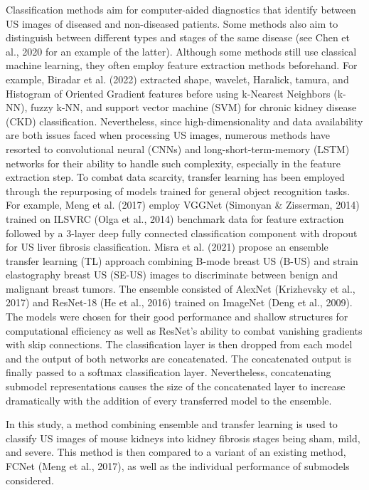\documentclass[
]{article}
\begin{document}
Classification methods aim for computer-aided diagnostics that identify
between US images of diseased and non-diseased patients. Some methods
also aim to distinguish between different types and stages of the same
disease (see Chen et al., 2020 for an example of the latter). Although
some methods still use classical machine learning, they often employ
feature extraction methods beforehand. For example, Biradar et al.
(2022) extracted shape, wavelet, Haralick, tamura, and Histogram of
Oriented Gradient features before using k-Nearest Neighbors (k-NN),
fuzzy k-NN, and support vector machine (SVM) for chronic kidney disease
(CKD) classification. Nevertheless, since high-dimensionality and data
availability are both issues faced when processing US images, numerous
methods have resorted to convolutional neural (CNNs) and
long-short-term-memory (LSTM) networks for their ability to handle such
complexity, especially in the feature extraction step. To combat data
scarcity, transfer learning has been employed through the repurposing of
models trained for general object recognition tasks. For example, Meng
et al. (2017) employ VGGNet (Simonyan \& Zisserman, 2014) trained on
ILSVRC (Olga et al., 2014) benchmark data for feature extraction
followed by a 3-layer deep fully connected classification component with
dropout for US liver fibrosis classification. Misra et al. (2021)
propose an ensemble transfer learning (TL) approach combining B-mode
breast US (B-US) and strain elastography breast US (SE-US) images to
discriminate between benign and malignant breast tumors. The ensemble
consisted of AlexNet (Krizhevsky et al., 2017) and ResNet-18 (He et al.,
2016) trained on ImageNet (Deng et al., 2009). The models were chosen
for their good performance and shallow structures for computational
efficiency as well as ResNet's ability to combat vanishing gradients
with skip connections. The classification layer is then dropped from
each model and the output of both networks are concatenated. The
concatenated output is finally passed to a softmax classification layer.
Nevertheless, concatenating submodel representations causes the size of
the concatenated layer to increase dramatically with the addition of
every transferred model to the ensemble.

In this study, a method combining ensemble and transfer learning is used
to classify US images of mouse kidneys into kidney fibrosis stages being
sham, mild, and severe. This method is then compared to a variant of an
existing method, FCNet (Meng et al., 2017), as well as the individual
performance of submodels considered.
\end{document}
